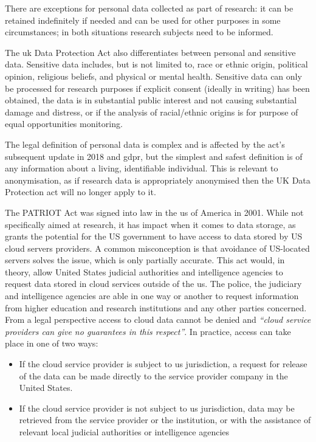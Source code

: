 There are exceptions for personal data collected as part of research: it can be retained indefinitely if needed and can be used for other purposes in some circumstances; in both situations research subjects need to be informed.

The \gls{uk} Data Protection Act also differentiates between personal and sensitive data. Sensitive data includes, but is not limited to, race or ethnic origin, political opinion, religious beliefs, and physical or mental health. Sensitive data can only be processed for research purposes if explicit consent (ideally in writing) has been obtained, the data is in substantial public interest and not causing substantial damage and distress, or if the analysis of racial/ethnic origins is for purpose of equal opportunities monitoring. 

The legal definition of  personal data is complex and is affected by the act's subsequent update in 2018 and \gls{gdpr}, but the simplest and safest definition is of any information about a living, identifiable individual. This is relevant to anonymisation, as if research data is appropriately anonymised then the UK Data Protection act will no longer apply to it.

The PATRIOT Act was signed into law in the \gls{us} of America in 2001. While not specifically aimed at research, it has impact when it comes to data storage, as grants the potential for the US government to have access to data stored by US cloud servers providers. A common misconception is that avoidance of US-located servers solves the issue, which is only partially accurate. This act would, in theory, allow United States judicial authorities and intelligence agencies to request data stored in cloud services outside of the \gls{us}. The police, the judiciary and intelligence agencies are able in one way or another to request information from higher education and research institutions and any other parties concerned. From a legal perspective access to cloud data cannot be denied and \emph{``cloud service providers can give no guarantees in this respect''}\cite{patriot}. In practice, access can take place in one of two ways:

\begin{itemize}
    \item If the cloud service provider is subject to \gls{us} jurisdiction, a request for release of the data can be made directly to the service provider company in the United States.
    \item If the cloud service provider is not subject to \gls{us} jurisdiction, data may be retrieved from the service provider or the institution, or with the assistance of relevant local judicial authorities or intelligence agencies
\end{itemize}

